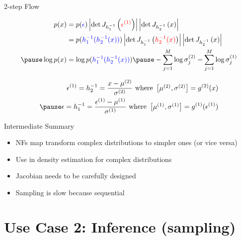 \documentclass[14pt]{beamer}
\begin{document}
\begin{frame}{2-step Flow}
\begin{small}
\begin{equation*}
\begin{aligned}
p(x) &= p(\textcolor{blue}{\epsilon})\djac{h_{1}^{-1}}{\textcolor{red}{\epsilon^{(1)}}}\djac{h_{2}^{-1}}{x} \\
&= p(\textcolor{blue}{h_{1}^{-1}(h_{2}^{-1}(x))})\djac{h_{1}^{-1}}{\textcolor{red}{h_{2}^{-1}(x)}}\djac{h_{2}^{-1}}{x} \\ \pause
\log p(x) &= \log p(\textcolor{blue}{h_{1}^{-1}(h_{2}^{-1}(x))})\pause -\sum_{j=1}^{M}\log\sigma^{(2)}_{j}-\sum_{j=1}^{M}\log\sigma^{(1)}_{j}
\end{aligned}
\end{equation*}
\end{small}
\pause
\begin{equation*}
\begin{aligned}
\epsilon^{(1)} = h^{-1}_{2} = \frac{x - \mu^{(2)}}{\sigma^{(2)}} \text{ where } \begin{bmatrix}\mu^{(2)}, \sigma^{(2)}\end{bmatrix} = g^{(2)}(x) \\ \pause
\epsilon = h^{-1}_{1} = \frac{\epsilon^{(1)} - \mu^{(1)}}{\sigma^{(1)}} \text{ where } \begin{bmatrix}\mu^{(1)}, \sigma^{(1)}\end{bmatrix} = g^{(1)}(\epsilon^{(1)})
\end{aligned}
\end{equation*}
\end{frame}

\begin{frame}{Intermediate Summary}
\begin{itemize}
\item NFs map transform complex distributions to simpler ones (or vice versa)
\item Use in density estimation for complex distributions
\item Jacobian needs to be carefully designed
\item Sampling is slow because sequential
\end{itemize}
\end{frame}

\section{Use Case 2: Inference (sampling)}
\begin{frame}
\tableofcontents[current]
\end{frame}
\end{document}
